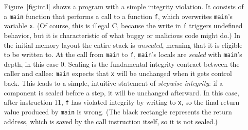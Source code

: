 \documentclass[acmsmall,review,anonymous]{acmart}\settopmatter{printfolios=true,printccs=false,printacmref=false}
\begin{document}
Figure~\ref{fig:int1} shows a program with a simple integrity violation. It consists of a {\tt main}
function that performs a call to a function {\tt f}, which overwrites {\tt main}'s
variable {\tt x}. (Of course, this is illegal C, because the write in {\tt f} triggers
undefined behavior, but it is characteristic of what buggy or malicious code might do.)
In the initial memory layout the entire stack is {\em unsealed},
meaning that it is eligible to be written to. At the call from {\tt main} to
{\tt f}, {\tt main}'s locals are {\em sealed} with {\tt main}'s depth,
in this case 0. Sealing is the fundamental integrity contract between the caller and callee:
{\tt main} expects that {\tt x} will be unchanged when it gets control back.
This leads to a simple, intuitive statement of {\em stepwise integrity}:
if a component is sealed before a step, it will be unchanged afterward.
In this case, after instruction 11, {\tt f} has violated integrity by writing to {\tt x},
so the final return value produced by {\tt main} is wrong.
%
(The black rectangle represents the return address, which is saved by the call
instruction itself, so it is not sealed.)
\end{document}
